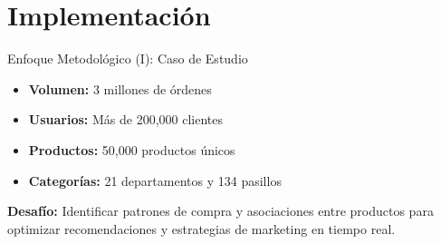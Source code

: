 \documentclass{beamer}
\begin{document}
\section{Implementación}
\begin{frame}{Enfoque Metodológico (I): Caso de Estudio}
    \begin{center}
        \begin{tcolorbox}[
            colback=apriori-orange!10,
            colframe=apriori-orange,
            width=0.9\textwidth,
            boxrule=1.5pt,
            arc=5mm,
            title={\textbf{Caso de Estudio: Base de datos de Instacart}},
            fonttitle=\bfseries,
            coltitle=black!90
        ]
            \begin{itemize}
                \item \textcolor{black!100}{\textbf{Volumen:} 3 millones de órdenes}
                \item \textcolor{black!100}{\textbf{Usuarios:} Más de 200,000 clientes}
                \item \textcolor{black!100}{\textbf{Productos:} 50,000 productos únicos}
                \item \textcolor{black!100}{\textbf{Categorías:} 21 departamentos y 134 pasillos}
            \end{itemize}
        \end{tcolorbox}
    \end{center}
    
    \vspace{0.5cm}
    \textbf{Desafío:} Identificar patrones de compra y asociaciones entre productos para optimizar recomendaciones y estrategias de marketing en tiempo real.
\end{frame}
\end{document}

